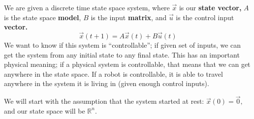 

We are given a discrete time state space system, where $\vec{x}$ is our \textbf{state vector,} $A$ is the state space \textbf{model}, $B$ is the input \textbf{matrix}, and $\vec{u}$ is the control input \textbf{vector.}
\begin{equation}
\vec{x}(t + 1) = A \vec{x}(t) + B\vec{u}(t)
\end{equation}
We want to know if this system is “controllable”; if given set of inputs, we can get the system from any initial state to any final state. This has an important physical meaning; if a physical system is controllable, that means that we can get anywhere in the state space. If a robot is controllable, it is able to travel anywhere in the system it is living in (given enough control inputs).

We will start with the assumption that the system started at rest: $\vec{x}(0) = \vec{0},$ and our state space will be $\mathbb{R}^{n}.$ 


